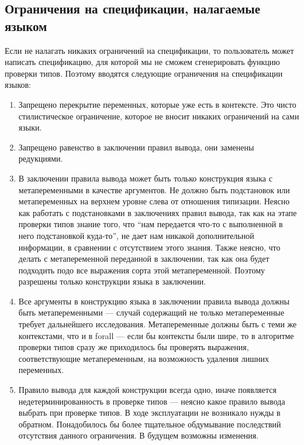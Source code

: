 \subsection{Ограничения на спецификации, налагаемые языком}\label{constraints}

Если не налагать никаких ограничений на спецификации, то пользователь может написать спецификацию, для которой мы не сможем сгенерировать функцию проверки типов. Поэтому вводятся следующие ограничения на спецификации языков:

\begin{enumerate}
\item Запрещено перекрытие переменных, которые уже есть в контексте. Это чисто стилистическое ограничение, которое не вносит никаких ограничений на сами языки.

\item Запрещено равенство в заключении правил вывода, они заменены редукциями.

\item \label{funsym_concl} В заключении правила вывода может быть только конструкция языка с метапеременными в качестве аргументов. Не должно быть подстановок или метапеременных на верхнем уровне слева от отношения типизации. Неясно как работать с подстановками в заключениях правил вывода, так как на этапе проверки типов знание того, что ``нам передается что-то с выполненной в него подстановкой куда-то'', не дает нам никакой дополнительной информации, в сравнении с отсутствием этого знания. Также неясно, что делать с метапеременной переданной в заключении, так как она будет подходить подо все выражения сорта этой метапеременной. Поэтому разрешены только конструкции языка в заключении.

\item Все аргументы в конструкцию языка в заключении правила вывода должны быть метапеременными --- случай содержащий не только метапеременные требует дальнейшего исследования. Метапеременные должны быть с теми же контекстами, что и в forall --- если бы контексты были шире, то в алгоритме проверки типов сразу же приходилось бы проверять выражения, соответствующие метапеременным, на возможность удаления лишних переменных.

\item \label{one_per_fun} Правило вывода для каждой конструкции всегда одно, иначе появляется недетерминированность в проверке типов --- неясно какое правило вывода выбрать при проверке типов. В ходе эксплуатации не возникало нужды в обратном. Понадобилось бы более тщательное обдумывание последствий отсутствия данного ограничения. В будущем возможны изменения.


\end{enumerate}
